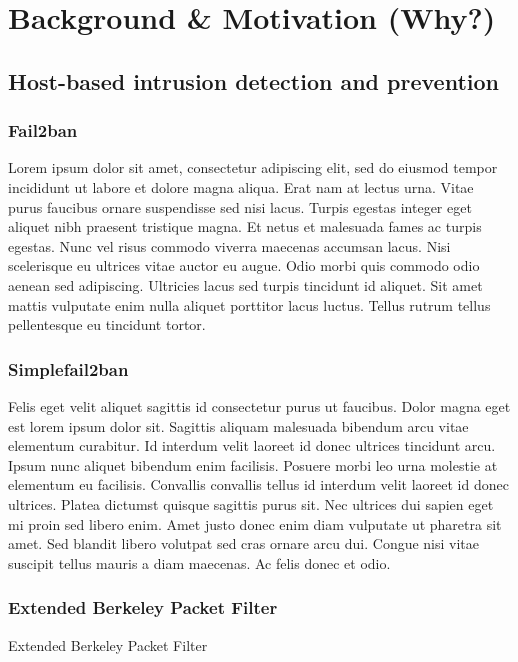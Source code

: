 %
%

\chapter{Background \& Motivation (Why?)}
\label{cha:background}

\section{Host-based intrusion detection and prevention}

\subsection{Fail2ban}
Lorem ipsum dolor sit amet, consectetur adipiscing elit, sed do eiusmod tempor incididunt ut labore et dolore magna aliqua. Erat nam at lectus urna. Vitae purus faucibus ornare suspendisse sed nisi lacus. Turpis egestas integer eget aliquet nibh praesent tristique magna. Et netus et malesuada fames ac turpis egestas. Nunc vel risus commodo viverra maecenas accumsan lacus. Nisi scelerisque eu ultrices vitae auctor eu augue. Odio morbi quis commodo odio aenean sed adipiscing. Ultricies lacus sed turpis tincidunt id aliquet. Sit amet mattis vulputate enim nulla aliquet porttitor lacus luctus. Tellus rutrum tellus pellentesque eu tincidunt tortor.

\subsection{Simplefail2ban}
Felis eget velit aliquet sagittis id consectetur purus ut faucibus. Dolor magna eget est lorem ipsum dolor sit. Sagittis aliquam malesuada bibendum arcu vitae elementum curabitur. Id interdum velit laoreet id donec ultrices tincidunt arcu. Ipsum nunc aliquet bibendum enim facilisis. Posuere morbi leo urna molestie at elementum eu facilisis. Convallis convallis tellus id interdum velit laoreet id donec ultrices. Platea dictumst quisque sagittis purus sit. Nec ultrices dui sapien eget mi proin sed libero enim. Amet justo donec enim diam vulputate ut pharetra sit amet. Sed blandit libero volutpat sed cras ornare arcu dui. Congue nisi vitae suscipit tellus mauris a diam maecenas. Ac felis donec et odio.

\subsection{Extended Berkeley Packet Filter}
Extended Berkeley Packet Filter

